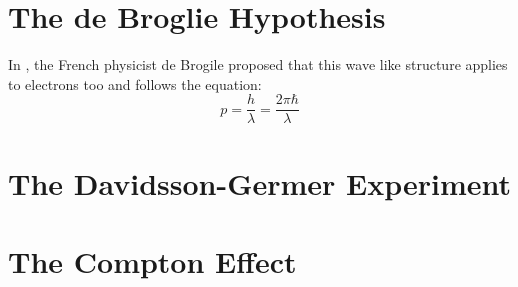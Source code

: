 \section{The de Broglie Hypothesis}
In , the French physicist de Brogile proposed that this wave like structure applies to electrons too and follows the equation:
\begin{equation}
	p = \frac{h}{\lambda} = \frac{2 \pi \hbar}{ \lambda}
\end{equation}
\section{The Davidsson-Germer Experiment}
\section{The Compton Effect}